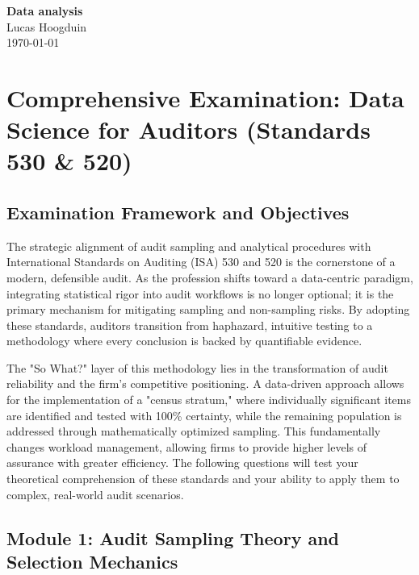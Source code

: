 \documentclass[12pt,a4paper]{memoir}
\begin{document}
\thispagestyle{empty}
\begin{center}
    \vspace*{2in}
    {\Huge \textbf{Data analysis}} \\
    \vspace{0.5in}
    {\Large Lucas Hoogduin} \\
    \vspace{0.5in}
    {\large \today}
\end{center}
\newpage

\chapter{Comprehensive Examination: Data Science for Auditors (Standards 530 \& 520)}

\section{Examination Framework and Objectives}

The strategic alignment of audit sampling and analytical procedures with International Standards on Auditing (ISA) 530 and 520 is the cornerstone of a modern, defensible audit. As the profession shifts toward a data-centric paradigm, integrating statistical rigor into audit workflows is no longer optional; it is the primary mechanism for mitigating sampling and non-sampling risks. By adopting these standards, auditors transition from haphazard, intuitive testing to a methodology where every conclusion is backed by quantifiable evidence.

The "So What?" layer of this methodology lies in the transformation of audit reliability and the firm's competitive positioning. A data-driven approach allows for the implementation of a "census stratum," where individually significant items are identified and tested with 100\% certainty, while the remaining population is addressed through mathematically optimized sampling. This fundamentally changes workload management, allowing firms to provide higher levels of assurance with greater efficiency. The following questions will test your theoretical comprehension of these standards and your ability to apply them to complex, real-world audit scenarios.

\section{Module 1: Audit Sampling Theory and Selection Mechanics}
\end{document}

